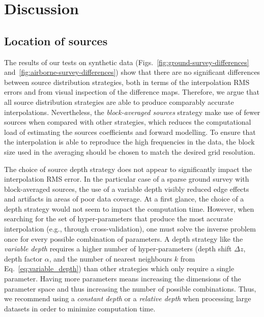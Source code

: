 
\section{Discussion}

\subsection{Location of sources}

The results of our tests on synthetic data
(Figs.~\ref{fig:ground-survey-differences}
and~\ref{fig:airborne-survey-differences}) show that there are no significant
differences between source distribution strategies, both in terms of the
interpolation RMS errors and from visual inspection of the difference maps.
Therefore, we argue that all source distribution strategies are able to produce
comparably accurate interpolations.
Nevertheless, the \emph{block-averaged sources} strategy make use of fewer
sources when compared with other strategies, which reduces the computational
load of estimating the sources coefficients and forward modelling.
To ensure that the interpolation is able to reproduce the high frequencies in
the data, the block size used in the averaging should be chosen to match the
desired grid resolution.

The choice of source depth strategy does not appear to significantly impact the
interpolation RMS error.
In the particular case of a sparse ground survey with block-averaged sources,
the use of a variable depth visibly reduced edge effects and artifacts in areas
of poor data coverage.
At a first glance, the choice of a depth strategy would not seem to impact
the computation time.
However, when searching for the set of hyper-parameters that produce the most
accurate interpolation (e.g., through cross-validation), one must solve the
inverse problem once for every possible combination of parameters.
A depth strategy like the \emph{variable depth} requires a higher number of
hyper-parameters (depth shift $\Delta z$, depth factor $\alpha$, and the number
of nearest neighbours $k$ from Eq.~\ref{eq:variable_depth}) than other
strategies which only require a single parameter.
Having more parameters means increasing the dimensions of the parameter space
and thus increasing the number of possible combinations.
Thus, we recommend using a \emph{constant depth} or a \emph{relative depth}
when processing large datasets in order to minimize computation time.

